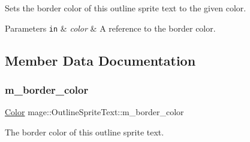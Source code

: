 Sets the border color of this outline sprite text to the given color.


\begin{DoxyParams}[1]{Parameters}
\mbox{\tt in}  & {\em color} & A reference to the border color. \\
\hline
\end{DoxyParams}


\subsection{Member Data Documentation}
\hypertarget{classmage_1_1_outline_sprite_text_a19301d370498a08759445f415da78822}{}\label{classmage_1_1_outline_sprite_text_a19301d370498a08759445f415da78822} 
\subsubsection{\texorpdfstring{m\+\_\+border\+\_\+color}{m\_border\_color}}
{\footnotesize\ttfamily \hyperlink{structmage_1_1_color}{Color} mage\+::\+Outline\+Sprite\+Text\+::m\+\_\+border\+\_\+color\hspace{0.3cm}{\ttfamily [private]}}

The border color of this outline sprite text. 